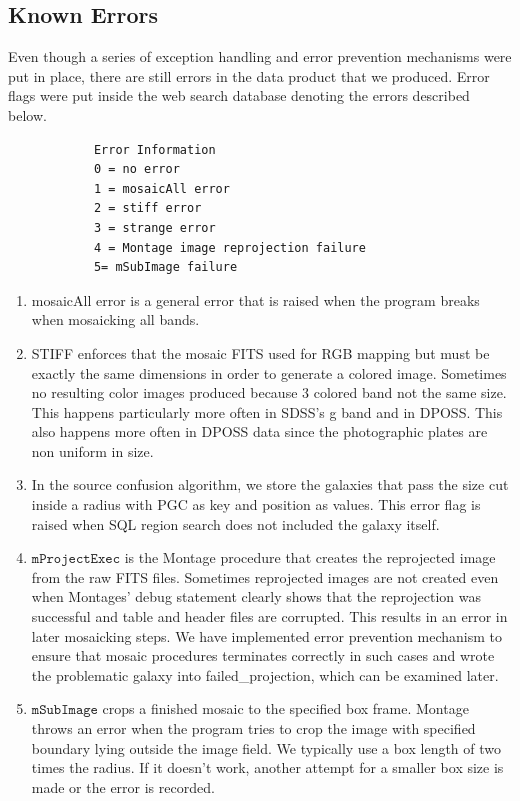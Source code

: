 \documentclass[authoryear, 12pt,5p, times]{elsarticle}
\begin{document}
\subsection{Known Errors}
	Even though a series of exception handling and error prevention mechanisms were put in place,  there are still errors in the data product that we produced. Error flags were put inside the web search database denoting the errors described below.
	\begin{verbatim}
			Error Information
			0 = no error
			1 = mosaicAll error
			2 = stiff error 
			3 = strange error
			4 = Montage image reprojection failure
			5= mSubImage failure
	\end{verbatim}
	 	\begin{enumerate}
	 	\item  mosaicAll error is a general error that is raised when the program breaks when mosaicking all bands.
	 	\item  STIFF  enforces that the mosaic FITS used for RGB mapping but must be exactly the same dimensions in order to generate a colored image. Sometimes no resulting color images produced because 3 colored band not the same size. This happens particularly more often in SDSS's g band and in DPOSS. %
This also happens more often in DPOSS data since the photographic plates are non uniform in size. 
	 	\item  In the source confusion algorithm, we store the galaxies that pass the size cut inside a radius with PGC as key and position as values. This error flag is raised when SQL region search does not included the galaxy itself. 
	 	\item  $\texttt{mProjectExec}$ is the Montage procedure that creates the reprojected image from the raw FITS files. Sometimes reprojected images are not created even when Montages' debug statement clearly shows that the reprojection was successful and table and header files are corrupted. This results in an error in later mosaicking steps. We have implemented error prevention mechanism to ensure that mosaic procedures terminates correctly in such cases and wrote the problematic galaxy into failed\_projection, which can be examined later. 
	 	\item  $\texttt{mSubImage}$ crops a finished mosaic to the specified box frame. Montage throws an error when the program tries to crop the image with specified boundary lying outside the image field. We typically use a box length of two times the radius. If it doesn't work, another attempt for a smaller box size is made or the error is recorded. 
	 	\end{enumerate}	 
\end{document}
